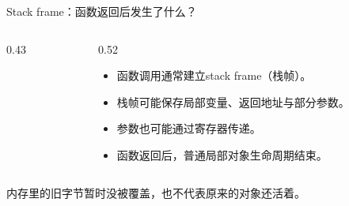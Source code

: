 \begin{frame}{Stack frame：函数返回后发生了什么？}

\begin{columns}[c]
\begin{column}{0.43\textwidth}
\end{column}
\begin{column}{0.52\textwidth}
\begin{itemize}
\item 函数调用通常建立stack frame（栈帧）。
\item 栈帧可能保存局部变量、返回地址与部分参数。
\item 参数也可能通过寄存器传递。
\item 函数返回后，普通局部对象生命周期结束。
\end{itemize}
\end{column}
\end{columns}
\medskip\alert{内存里的旧字节暂时没被覆盖，也不代表原来的对象还活着。}

\end{frame}
